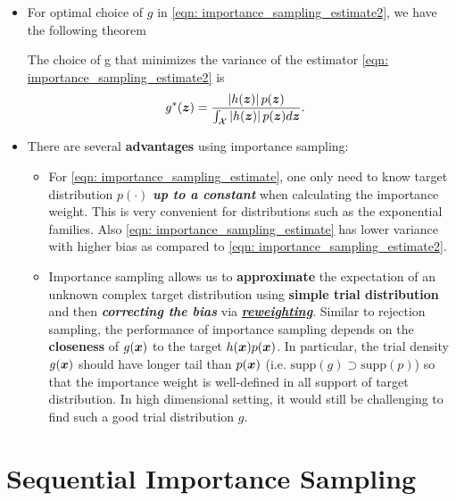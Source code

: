 \documentclass[11pt]{article}
\begin{document}
\begin{itemize}
\item For optimal choice of $g$ in \eqref{eqn: importance_sampling_estimate2}, we have the following theorem
\begin{theorem} \citep{robert1999monte}
The choice of g that minimizes the variance of the estimator \eqref{eqn: importance_sampling_estimate2} is
\begin{align*}
g^{*}(\boldsymbol{z}) &= \frac{\left\lvert h(\boldsymbol{z}) \right\rvert p(\boldsymbol{z}) }{\int_{{\mathcal X}}\left\lvert h(\boldsymbol{z}) \right\rvert p(\boldsymbol{z}) d\boldsymbol{z} }.
\end{align*}
\end{theorem}


\item There are several \textbf{advantages} using importance sampling:
\begin{itemize}
\item For \eqref{eqn: importance_sampling_estimate}, one only need to know target distribution $p(\cdot)$ \emph{\textbf{up to a constant}} when calculating the importance weight. This is very convenient for distributions such as the exponential families. Also \eqref{eqn: importance_sampling_estimate} has lower variance with higher bias as compared to \eqref{eqn: importance_sampling_estimate2}.

\item Importance sampling allows us to \textbf{approximate} the expectation of an unknown complex target distribution using \textbf{simple trial distribution} and then \textbf{\emph{correcting the bias}} via \underline{\textbf{\emph{reweighting}}}. Similar to rejection sampling, the performance of importance sampling depends on the \textbf{closeness} of $g(\boldsymbol{x})$ to the target $h(\boldsymbol{x})p(\boldsymbol{x})$. In particular, the trial density $g(\boldsymbol{x})$ should have longer tail than $p(\boldsymbol{x})$ (i.e. $\text{supp}(g) \supset \text{supp}(p)$) so that the importance weight is well-defined in all support of target distribution. In high dimensional setting, it would still be challenging to find such a good trial distribution $g$.
\end{itemize}
\end{itemize}


\section{Sequential Importance Sampling}
\end{document}
